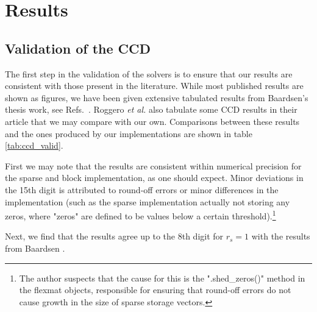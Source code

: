 
\chapter{Results} %

\label{Chapter8} %



\section{Validation of the CCD}

The first step in the validation of the solvers is to ensure that
our results are consistent with those present in the literature. While
most published results are shown as figures, we have been given extensive
tabulated results from Baardsen's thesis work, see Refs.~\cite{Baardsen2014,Baardsen2015}.
Roggero {\em et al.} also tabulate some CCD results in their article
\cite{Roggero2013} that we may compare with our own. Comparisons
between these results and the ones produced by our implementations are
shown in table \ref{tab:ccd_valid}.

First we may note that the results are consistent within numerical
precision for the sparse and block implementation, as one should
expect. Minor deviations in the 15th digit is attributed
to round-off errors or minor differences in the implementation (such
as the sparse implementation actually not storing any zeros, where
"zeros" are defined to be values below a certain
threshold).\footnote{The author suspects that the cause for this is
  the ".shed\_zeros()" method in the flexmat objects, responsible for
  ensuring that round-off errors do not cause growth in the size of
  sparse storage vectors.}

Next, we find that the results agree up to the 8th digit for $r_s = 1$ with the results from Baardsen \cite{Baardsen2015}.


